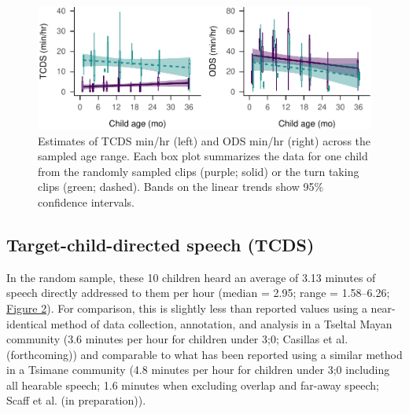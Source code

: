 \documentclass[,man,floatsintext]{apa6}
\begin{document}
\begin{figure}
\centering
\includegraphics{Yeli-CLE_files/figure-latex/fig2-1.pdf}
\caption{\label{fig:fig2}Estimates of TCDS min/hr (left) and ODS min/hr
(right) across the sampled age range. Each box plot summarizes the data
for one child from the randomly sampled clips (purple; solid) or the
turn taking clips (green; dashed). Bands on the linear trends show 95\%
confidence intervals.}
\end{figure}

\subsection{Target-child-directed speech
(TCDS)}\label{target-child-directed-speech-tcds}

In the random sample, these 10 children heard an average of 3.13 minutes
of speech directly addressed to them per hour (median = 2.95; range =
1.58--6.26; \protect\hyperlink{fig2}{Figure 2}). For comparison, this is
slightly less than reported values using a near-identical method of data
collection, annotation, and analysis in a Tseltal Mayan community (3.6
minutes per hour for children under 3;0; Casillas et al. (forthcoming))
and comparable to what has been reported using a similar method in a
Tsimane community (4.8 minutes per hour for children under 3;0 including
all hearable speech; 1.6 minutes when excluding overlap and far-away
speech; Scaff et al. (in preparation)).
\end{document}
